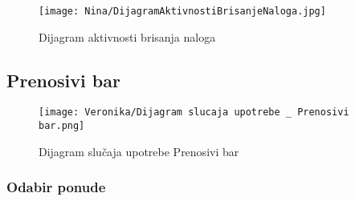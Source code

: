 \documentclass[a4paper]{article}
\begin{document}
\begin{figure}[H]
    \centering
    \texttt{[image: Nina/DijagramAktivnostiBrisanjeNaloga.jpg]}
    \caption{Dijagram aktivnosti brisanja naloga}
    \label{fig:RegistracijaZ}
\end{figure}




\subsection{Prenosivi bar}

\begin{figure}[H]
    \centering
    \texttt{[image: Veronika/Dijagram slucaja upotrebe \_ Prenosivi bar.png]}
    \caption{Dijagram slučaja upotrebe Prenosivi bar}
    \label{fig:PrenosiviBar}
\end{figure}

\subsubsection{Odabir ponude}
\end{document}
